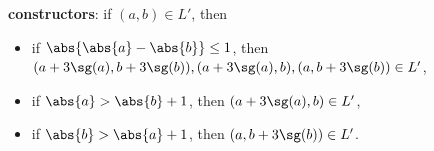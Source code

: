 \begin{problem}
{\textbf{constructors}: if $(a,b) \in L'$, then

\begin{itemize}

\item if $\abs{\abs{a} - \abs{b}} \leq 1 $, then $(a+3\sg(a),b+3\sg(b)),
  (a+3\sg(a),b), (a,b+3\sg(b)) \in L'$,

\item if $\abs{a} > \abs{b}+1$, then $(a+3\sg(a),b) \in L'$,

\item if $\abs{b} > \abs{a} + 1$, then $(a,b+3\sg(b)) \in L'$.

\end{itemize}
}

\eparts
\end{problem}

